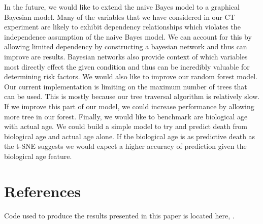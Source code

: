 \documentclass{article}
\begin{document}
In the future, we would like to extend the naive Bayes model to a graphical Bayesian model. Many of the variables that we have considered in our CT experiment are likely to exhibit dependency relationships which violates the independence assumption of the naive Bayes model. We can account for this by allowing limited dependency by constructing a bayesian network and thus can improve are results. Bayesian networks also provide context of which variables most directly effect the given condition and thus can be incredibly valuable for determining risk factors. We would also like to improve our random forest model. Our current implementation is limiting on the maximum number of trees that can be used. This is mostly because our tree traversal algorithm is relatively slow. If we improve this part of our model, we could increase performance by allowing more tree in our forest. Finally, we would like to benchmark are biological age with actual age. We could build a simple model to try and predict death from biological age and actual age alone. If the biological age is as predictive death as the t-SNE suggests we would expect a higher accuracy of prediction given the biological age feature.  


\section{References}
Code used to produce the results presented in this paper is located here, . 

 

\end{document}
